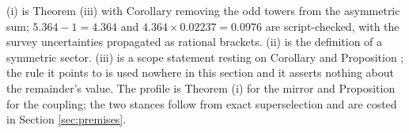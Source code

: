 (i) is Theorem (iii) with Corollary  removing the odd towers from the asymmetric sum; $5.364 - 1 = 4.364$ and $4.364 \times 0.02237 = 0.0976$ are script-checked, with the survey uncertainties propagated as rational brackets. (ii) is the definition of a symmetric sector. (iii) is a scope statement resting on Corollary  and Proposition ; the rule it points to is used nowhere in this section and it asserts nothing about the remainder's value. The profile is Theorem (i) for the mirror and Proposition  for the coupling; the two stances follow from exact superselection and are costed in Section \ref{sec:premises}.

